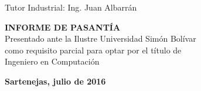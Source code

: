 \begin{titlepage}
\begin{center}
\begin{minipage}{\textwidth}
            Tutor Industrial: Ing. Juan Albarrán\\
            
            \bigskip
            \bigskip
            \vfill
            
            \textbf{INFORME DE PASANTÍA}\\
            
            Presentado ante la Ilustre Universidad Simón Bolívar\\
            
            como requisito parcial para optar por el título de\\
            
            Ingeniero en Computación
            
        \end{minipage}
        
        \bigskip
        \bigskip
        \vfill
        
         {\large \bfseries Sartenejas, julio de 2016}
    \end{center}
        
\end{titlepage}

\pagebreak